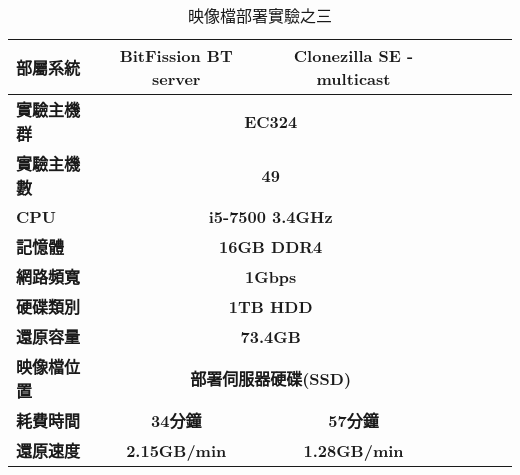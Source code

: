 \begin{table}[!htbp]
\centering
\caption{映像檔部署實驗之三}
\label{exp3}
\begin{adjustbox}{max width=0.92\textwidth}
\begin{tabular}{lcccccc}

\toprule
\multicolumn{1}{l}{\textbf{部屬系統}} & \textbf{BitFission BT server} & \textbf{Clonezilla SE - multicast} \\ \midrule
\multicolumn{1}{l}{\textbf{實驗主機群}} & \multicolumn{2}{c}{\textbf{EC324}} \\
\multicolumn{1}{l}{\textbf{實驗主機數}} & \multicolumn{2}{c}{\textbf{49}} \\
\multicolumn{1}{l}{\textbf{CPU}} & \multicolumn{2}{c}{\textbf{i5-7500 3.4GHz}} \\
\multicolumn{1}{l}{\textbf{記憶體}} & \multicolumn{2}{c}{\textbf{16GB DDR4}} \\
\multicolumn{1}{l}{\textbf{網路頻寬}} & \multicolumn{2}{c}{\textbf{1Gbps}} \\
\multicolumn{1}{l}{\textbf{硬碟類別}} & \multicolumn{2}{c}{\textbf{1TB HDD}} \\
\multicolumn{1}{l}{\textbf{還原容量}} & \multicolumn{2}{c}{\textbf{73.4GB}} \\
\multicolumn{1}{l}{\textbf{映像檔位置}} & \multicolumn{2}{c}{\textbf{部署伺服器硬碟(SSD)}} \\
\multicolumn{1}{l}{\textbf{耗費時間}} & \textbf{34分鐘} & \textbf{57分鐘} \\
\multicolumn{1}{l}{\textbf{還原速度}} & \textbf{2.15GB/min} & \textbf{1.28GB/min} \\

\bottomrule
\end{tabular}
\end{adjustbox}
\end{table}
